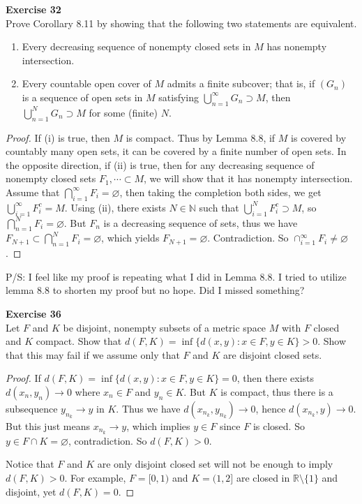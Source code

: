 \documentclass[12pt, a4paper]{article}
\theoremstyle{plain}
\newcommand{\N}{\mathbb{N}}
\newcommand{\R}{\mathbb{R}}
\newenvironment{exercise}[2][Exercise]
    { \begin{mdframed}[backgroundcolor=gray!20] \textbf{#1 #2} \\}
    {  \end{mdframed}}
\begin{document}
\pagebreak

\begin{exercise}{32}
Prove Corollary 8.11 by showing that the following two statements are equivalent.
\begin{enumerate}[label=(\roman*)]
\item Every decreasing sequence of nonempty closed sets in $M$ has nonempty intersection.

\item Every countable open cover of $M$ admits a finite subcover; that is, if $(G_n)$ is a sequence of open sets in $M$ satisfying $\bigcup_{n=1}^\infty G_n\supset M$, then $\bigcup_{n=1}^N G_n\supset M$ for some (finite) $N$.
\end{enumerate}
\end{exercise}
	\begin{proof}
	If (i) is true, then $M$ is compact. Thus by Lemma 8.8, if $M$ is covered by countably many open sets, it can be covered by a finite number of open sets. In the opposite direction, if (ii) is true, then for any decreasing sequence  of nonempty closed sets $F_1,\cdots \subset M$, we will show that it has nonempty intersection. Assume that $\bigcap_{i=1}^\infty F_i=\varnothing$, then taking the completion both sides, we get $\bigcup_{i=1}^\infty F_i^c = M$. Using (ii), there exists $N\in\N$ such that $\bigcup_{i=1}^N F_i^c \supset M$, so $\bigcap_{n=1}^N F_i=\varnothing$. But $F_n$ is a decreasing sequence of sets, thus we have $F_{N+1}\subset \bigcap_{n=1}^N F_i=\varnothing$, which yields $F_{N+1}=\varnothing$. Contradiction. So $\cap_{i=1}^\infty F_i\neq \varnothing$.
	\end{proof}
	
P/S: I feel like my proof is repeating what I did in Lemma 8.8. I tried to utilize lemma 8.8 to shorten my proof but no hope. Did I missed something?

\begin{exercise}{36}
Let $F$ and $K$ be disjoint, nonempty subsets of a metric space $M$ with $F$ closed and $K$ compact. Show that $d(F,K)=\inf \{d(x,y):x\in F, y\in K\}>0$. Show that this may fail if we assume only that $F$ and $K$ are disjoint closed sets.
\end{exercise}
	\begin{proof}
	If $d(F,K)=\inf\{d(x,y):x\in F, y\in K\}=0$, then there exists $d(x_n,y_n)\rightarrow 0$ where $x_n\in F$ and $y_n\in K$. But $K$ is compact, thus there is a subsequence $y_{n_k}\rightarrow y$ in $K$. Thus we have $d(x_{n_k},y_{n_k})\rightarrow 0$, hence $d(x_{n_k},y)\rightarrow 0$. But this just means $x_{n_k}\rightarrow y$, which implies $y\in F$ since $F$ is closed. So $y\in F\cap K=\varnothing$, contradiction. So $d(F,K)>0$.
	
	Notice that $F$ and $K$ are only disjoint closed set will not be enough to imply $d(F,K)>0$. For example, $F=[0,1)$ and $K=(1,2]$ are closed in $\R\setminus\{1\}$ and disjoint, yet $d(F,K)=0$.
	\end{proof}
\end{document}
